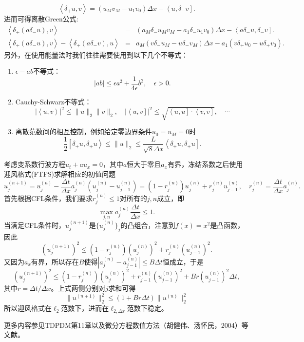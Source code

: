 \documentclass[a4paper,10pt]{ctexart}
\begin{document}
\begin{equation}
    \left<\delta_{+}u,v\right> = (u_Mv_M-u_1v_0)\Delta x - \left<u, \delta_-v\right].
\end{equation}
进而可得离散Green公式:
\begin{eqnarray}
    \left<\delta_+(a \delta_- u), v\right> &=& (a_M \delta_-u_M v_M - a_1\delta_-u_1v_0)\Delta x - \left<a\delta_-u, \delta_-v\right].\\
    \left<\delta_+(a \delta_- u), v\right> - \left<\delta_+(a \delta_- v), u\right> &=& a_M(v \delta_-u_M-u\delta_-v_M)\Delta x - a_1(v\delta_+u_0-u\delta_+v_0).
\end{eqnarray}
另外，在使用能量法时我们往往需要使用到以下几个不等式：
\begin{enumerate}
    \item $ \epsilon-ab $不等式：
    \begin{equation}
        |ab| \leqslant \epsilon a^2 + \frac{1}{4 \epsilon}b^2,\quad \epsilon>0.
    \end{equation}
    \item Cauchy-Schwarz不等式：
    \begin{equation}
        |\left<u, v\right>|^2\leqslant \| u \|_2\| v \|_2,\quad |\left<u,v \right]|^2\leqslant \sqrt{\left<u,u \right] \cdot \left<v,v \right]} ,\quad \cdots 
    \end{equation}
    \item 离散范数间的相互控制，例如给定零边界条件$ u_0=u_M=0 $时
    \begin{equation}
        \frac{1}{2}\left[\delta_+ u, \delta_+ u\right>\leqslant \| u \|_2 \leqslant \frac{L}{\sqrt{8} \Delta x}\left<\delta_+ u, \delta_+ u\right].
    \end{equation}
\end{enumerate}
\begin{example}
    考虑变系数行波方程$ u_t + au_x = 0 $，其中$ a $恒大于零且$ a_x $有界，冻结系数之后使用迎风格式(FTFS)求解相应的初值问题
    \[
        u^{(n+1)}_j = u^{(n)}_j - \frac{\Delta t}{\Delta x}a_j^{(n)}(u^{(n)}_j - u^{(n)}_{j-1}) = (1-r_j^{(n)})u^{(n)}_j + r_j^{(n)}u^{(n)}_{j-1},\quad r_j^{(n)} = \frac{\Delta t}{\Delta x}a_j^{(n)}.
    \]
    首先根据CFL条件，我们要求$ r_j^{(n)}\leqslant 1 $对所有的$ j,n $成立，即
    \[
        \max_{j,n} a_j^{(n)} \frac{\Delta t}{\Delta x} \leqslant 1.  
    \]
    当满足CFL条件时，$ u^{(n+1)}_j $是$ \{u^{(n)}_j\}_j $的凸组合，注意到$ f(x)=x^2 $是凸函数，因此
    \[
        (u^{(n+1)}_j)^2 \leqslant (1-r_j^{(n)})(u^{(n)}_j)^2 + r_j^{(n)}(u^{(n)}_{j-1})^2.
    \]
    又因为$ a_x $有界，所以存在$ B $使得$ |a^{(n)}_j-a^{(n)}_{j-1}|\leqslant B \Delta t $恒成立，于是
    \[
        (u^{(n+1)}_j)^2 \leqslant (1-r_j^{(n)})(u^{(n)}_j)^2 + r_{j-1}^{(n)}(u^{(n)}_{j-1})^2 + Br(u^{(n)}_{j-1})^2 \Delta t,
    \]
    其中$ r = \Delta t / \Delta x $。上式两侧分别对$ j $求和可得
    \[
        \| u^{(n+1)} \|_2^2 \leqslant (1+Br \Delta t)\| u^{(n)} \|_2^2
    \]
    所以迎风格式在$ \ell_2 $范数下，进而在$ \ell_{2,\Delta x} $范数下稳定。
\end{example}
更多内容参见TDPDM第11章以及微分方程数值方法（胡健伟、汤怀民，2004）等文献。
\end{document}
